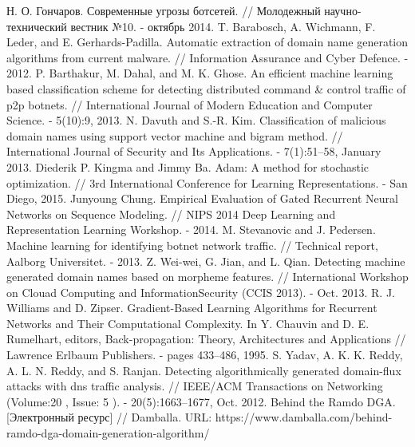 \begingroup 
\renewcommand{\section}[2]{\anonsection{Библиографический список}}
\begin{thebibliography}{00}
    Н. О. Гончаров.
    Современные угрозы ботсетей. //
    Молодежный научно-технический вестник №10. - октябрь 2014.
	T. Barabosch, A. Wichmann, F. Leder, and E. Gerhards-Padilla.
    Automatic extraction of domain name generation algorithms from current malware. //
    Information Assurance and Cyber Defence. - 2012.
    P. Barthakur, M. Dahal, and M. K. Ghose.
    An efficient machine learning based classification scheme for detecting distributed command \& control traffic of p2p botnets. //
    International Journal of Modern Education and Computer Science. - 5(10):9, 2013.
    N. Davuth and S.-R. Kim.
    Classification of malicious domain names using support vector machine and bigram method. //
    International Journal of Security and Its Applications. - 7(1):51–58, January 2013.
    Diederik P. Kingma and Jimmy Ba.
    Adam: A method for stochastic optimization. //
    3rd International Conference for Learning Representations. - San Diego, 2015.
    Junyoung Chung.
    Empirical Evaluation of Gated Recurrent Neural Networks on Sequence Modeling. //
    NIPS 2014 Deep Learning and Representation Learning Workshop. - 2014.
    M. Stevanovic and J. Pedersen.
    Machine learning for identifying botnet network traffic. //
    Technical report, Aalborg Universitet. - 2013.
    Z. Wei-wei, G. Jian, and L. Qian.
    Detecting machine generated domain names based on morpheme features. //
    International Workshop on Clouad Computing and InformationSecurity (CCIS 2013). - Oct. 2013.
    R. J. Williams and D. Zipser. Gradient-Based Learning Algorithms for Recurrent Networks and Their Computational Complexity. In Y. Chauvin and D. E. Rumelhart, editors, Back-propagation: Theory, Architectures and Applications // Lawrence Erlbaum Publishers. - pages 433–486, 1995.
    S. Yadav, A. K. K. Reddy, A. L. N. Reddy, and S. Ranjan.
    Detecting algorithmically generated domain-flux attacks with dns traffic analysis. //
    IEEE/ACM Transactions on Networking  (Volume:20 ,  Issue: 5 ). - 20(5):1663–1677, Oct. 2012.
    Behind the Ramdo DGA. [Электронный ресурс] // Damballa.
    URL: https://www.damballa.com/behind-ramdo-dga-domain-generation-algorithm/

\end{thebibliography}

